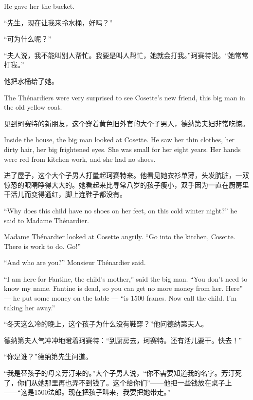 \documentclass[fontset=ubuntu, zihao=5]{ctexart}
\begin{document}
\begin{paracol}{2}
  He gave her the bucket.

  \switchcolumn

  “先生，现在让我来拎水桶，好吗？”

  “可为什么呢？”

  “夫人说，我不能叫别人帮忙。我要是叫人帮忙，她就会打我。”珂赛特说。“她常常打我。”

  他把水桶给了她。

  \switchcolumn*

  The Thénardiers were very surprised to see Cosette's new friend, this big man in the old yellow coat.

  \switchcolumn

  见到珂赛特的新朋友，这个穿着黄色旧外套的大个子男人，德纳第夫妇非常吃惊。

  \switchcolumn*

  Inside the house, the big man looked at Cosette. He saw her thin clothes, her dirty hair, her big frightened eyes. She was small for her eight years. Her hands were red from kitchen work, and she had no shoes.

  \switchcolumn

  进了屋子，这个大个子男人打量起珂赛特来。他看见她衣衫单薄，头发肮脏，一双惊恐的眼睛睁得大大的。她看起来比寻常八岁的孩子瘦小，双手因为一直在厨房里干活儿而变得通红，脚上连鞋子都没有。

  \switchcolumn*

  ``Why does this child have no shoes on her feet, on this cold winter night?'' he said to Madame Thénardier.


  Madame Thénardier looked at Cosette angrily. ``Go into the kitchen, Cosette. There is work to do. Go!''


  ``And who are you?'' Monsieur Thénardier said.


  ``I am here for Fantine, the child's mother,'' said the big man. ``You don't need to know my name. Fantine is dead, so you can get no more money from her. Here'' --- he put some money on the table --- ``is 1500 francs. Now call the child. I'm taking her away.''

  \switchcolumn

  “冬天这么冷的晚上，这个孩子为什么没有鞋穿？”他问德纳第夫人。

  德纳第夫人气冲冲地瞪着珂赛特：“到厨房去，珂赛特。还有活儿要干。快去！”

  “你是谁？”德纳第先生问道。

  “我是替孩子的母亲芳汀来的。”大个子男人说，“你不需要知道我的名字。芳汀死了，你们从她那里再也弄不到钱了。这个给你们”——他把一些钱放在桌子上——“这是1500法郎。现在把孩子叫来，我要把她带走。”


\end{paracol}
\end{document}
